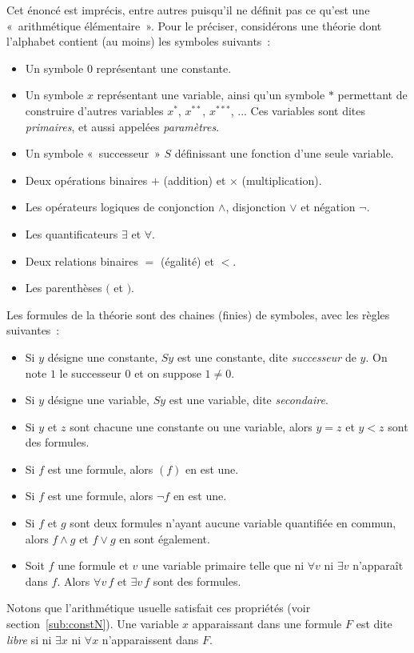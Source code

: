 \noindent Cet énoncé est imprécis, entre autres puisqu'il ne définit pas ce qu'est une « arithmétique élémentaire ». 
Pour le préciser, considérons une théorie dont l'alphabet contient (au moins) les symboles suivants : 
\begin{itemize}[nosep]
    \item Un symbole $0$ représentant une constante. 
    \item Un symbole $x$ représentant une variable, ainsi qu'un symbole $\ast$ permettant de construire d'autres variables $x^\ast$, $x^{\ast\ast}$, $x^{\ast\ast\ast}$, ... Ces variables sont dites \emph{primaires}, et aussi appelées \emph{paramètres}.
    \item Un symbole « successeur » $S$ définissant une fonction d'une seule variable. 
    \item Deux opérations binaires $+$ (addition) et $\times$ (multiplication).
    \item Les opérateurs logiques de conjonction $\wedge$, disjonction $\vee$ et négation $\neg$.
    \item Les quantificateurs $\exists$ et $\forall$. 
    \item Deux relations binaires $=$ (égalité) et $<$.
    \item Les parenthèses $($ et $)$.
\end{itemize}

Les formules de la théorie sont des chaines (finies) de symboles, avec les règles suivantes : 
\begin{itemize}[nosep]
    \item Si $y$ désigne une constante, $S y$ est une constante, dite \textit{successeur} de $y$. 
        On note $1$ le successeur $0$ et on suppose $1 \neq 0$.
    \item Si $y$ désigne une variable, $S y$ est une variable, dite \emph{secondaire}.
    \item Si $y$ et $z$ sont chacune une constante ou une variable, alors $y = z$ et $y < z$ sont des formules.
    \item Si $f$ est une formule, alors $(f)$ en est une. 
    \item Si $f$ est une formule, alors $\neg f$ en est une. 
    \item Si $f$ et $g$ sont deux formules n'ayant aucune variable quantifiée en commun, alors $f \wedge g$ et $f \vee g$ en sont également. 
    \item Soit $f$ une formule et $v$ une variable primaire telle que ni $\forall v$ ni $\exists v$ n'apparaît dans $f$. 
        Alors $\forall v \, f$ et $\exists v \, f$ sont des formules.
\end{itemize}
Notons que l'arithmétique usuelle satisfait ces propriétés (voir section~\ref{sub:constN}).
Une variable $x$ apparaissant dans une formule $F$ est dite \emph{libre} si ni $\exists x$ ni $\forall x$ n'apparaissent dans $F$.

